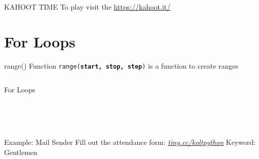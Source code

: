         \begin{frame}{KAHOOT TIME}
            \LARGE{To play visit the \href{https://kahoot.it/}{https://kahoot.it/}}
            
        \end{frame}

        \section{For Loops}
      
        \begin{frame}{range() Function}
            \pause
            \LARGE
            \texttt{range(\textbf{start, stop, step})} is a function to create ranges
            \bigskip
            \inputminted[frame=single,framesep=2pt]{python3}{../Lecture3/code-examples/range.py}
        \end{frame}
        
        \begin{frame}{For Loops}
            \pause
            \begin{columns}
                \begin{column}{0.5\textwidth}
                    \inputminted[frame=single,framesep=2pt]{python3}{../Lecture3/code-examples/for1.py}
                \end{column}
               \pause 
                \begin{column}{0.5\textwidth}
                    \inputminted[frame=single,framesep=2pt]{python3}{../Lecture3/code-examples/for2.py}
                    \pause
                    \inputminted[frame=single,framesep=2pt]{python3}{../Lecture3/code-examples/for3.py}
                    \pause
                    \inputminted[frame=single,framesep=2pt]{python3}{../Lecture3/code-examples/for4.py}
                \end{column} 
            \end{columns}
        \end{frame}
        
        \begin{frame}{Example: Mail Sender}
            \pause
            \LARGE
            Fill out the attendance form:
            \newline
            \newline
            \href{https://tiny.cc/koltpython}{\underline{\textit{tiny.cc/koltpython}}}
            \newline
            \newline
            Keyword: Gentlemen
        \end{frame}

